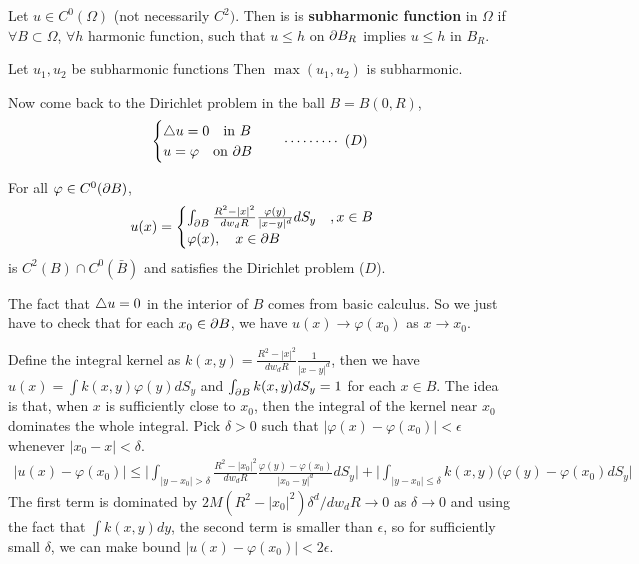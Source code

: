 \documentclass[12pt,a4paper]{article}
\newenvironment{proof}
{\begin{changemargin}{0.5cm}{0.5cm} 
	}%
	{\end{changemargin}
}
\newenvironment{p}
{\begin{proof} 
	}%
	{\end{proof}
}
\begin{document}
 Let $u\in C^0(\Omega)$ (not necessarily $C^2)$. Then is is \textbf{subharmonic function} in $\Omega$ if $\forall B \subset \Omega$, $\forall h$ harmonic function, such that $u\leq h$ on $\partial B_R$ implies $u\leq h$ in $B_R$.
\s 

\lem Let $u_1, u_2$ be subharmonic functions Then $\max(u_1, u_2)$ is subharmonic.
\s

Now come back to the Dirichlet problem in the ball $B = B(0, R)$,
\begin{align*}
\begin{cases}
\triangle u =0 \quad \text{in } B\\
u = \varphi \quad \text{on } \partial B
\end{cases} \quad \cdots\cdots\cdots\,\,(D)
\end{align*}
\s

\thm For all $\varphi \in C^0(\partial B)$,
\begin{align*}
u(x) = \begin{cases}
\int_{\partial B} \frac{R^2 - |x|^2}{dw_d R} \frac{\varphi(y)}{|x-y|^d} dS_y \quad, x\in B\\
\varphi(x), \quad x\in \partial B
\end{cases}
\end{align*}
is $C^2(B) \cap C^0(\bar{B})$ and satisfies the Dirichlet problem ($D$). 
\begin{p}
\pf The fact that $\triangle u =0$ in the interior of $B$ comes from basic calculus. So we just have to check that for each $x_0 \in \partial B$, we have $u(x) \rightarrow \varphi(x_0)$ as $x\rightarrow x_0$.

\quad Define the integral kernel as $k(x,y) = \frac{R^2 - |x|^2}{dw_d R} \frac{1}{|x-y|^d}$, then we have $u(x) = \int k(x,y) \varphi(y) dS_y$ and $\int_{\partial B} k(x,y) dS_y =1$ for each $x\in B$. The idea is that, when $x$ is sufficiently close to $x_0$, then the integral of the kernel near $x_0$ dominates the whole integral. Pick $\delta>0$ such that $|\varphi(x)- \varphi(x_0)|< \epsilon$ whenever $|x_0 -x| < \delta$.
\begin{align*}
|u(x)- \varphi(x_0)| \leq \Big| \int_{|y-x_0|> \delta} \frac{R^2 - |x_0|^2}{dw_d R} \frac{\varphi(y) - \varphi(x_0)}{|x_0 - y|^d} dS_y \Big| + \Big| \int_{|y-x_0| \leq \delta} k(x,y)(\varphi(y)-\varphi(x_0) dS_y \Big|
\end{align*}
The first term is dominated by $2M(R^2 - |x_0|^2)\delta^d / dw_d R \rightarrow 0$ as $\delta \rightarrow 0$ and using the fact that $\int k(x,y)dy$, the second term is smaller than $\epsilon$, so for sufficiently small $\delta$, we can make bound $|u(x) - \varphi(x_0)|< 2\epsilon$.

\eop
\end{p}
\s
\end{document}
